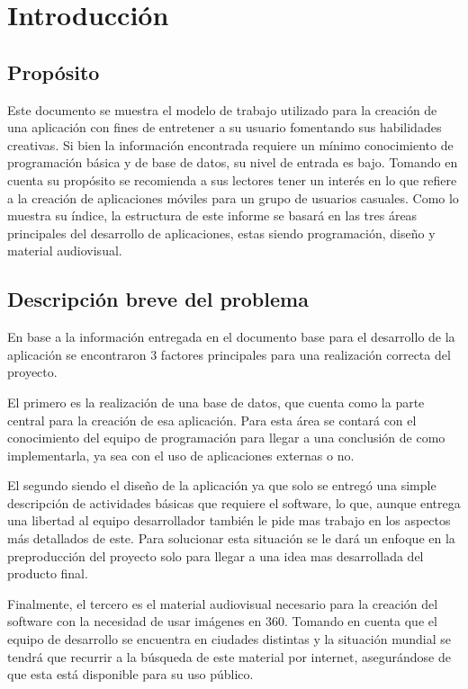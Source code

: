 \section{Introducción}
\subsection{Propósito}
Este documento se muestra el modelo de trabajo utilizado para la creación de una aplicación con fines de entretener a su usuario fomentando sus habilidades creativas. Si bien la información encontrada requiere un mínimo conocimiento de programación básica y de base de datos, su nivel de entrada es bajo. Tomando en cuenta su propósito se recomienda a sus lectores tener un interés en lo que refiere a la creación de aplicaciones móviles para un grupo de usuarios casuales. Como lo muestra su índice, la estructura de este informe se basará en las tres áreas principales del desarrollo de aplicaciones, estas siendo programación, diseño y material audiovisual.
\subsection{Descripción breve del problema}
En base a la información entregada en el documento base para el desarrollo de la aplicación se encontraron 3 factores principales para una realización correcta del proyecto. 

El primero es la realización de una base de datos, que cuenta como la parte central para la creación de esa aplicación. Para esta área se contará con el conocimiento del equipo de programación para llegar a una conclusión de como implementarla, ya sea con el uso de aplicaciones externas o no.

 El segundo siendo el diseño de la aplicación ya que solo se entregó una simple descripción de actividades básicas que requiere el software, lo que, aunque entrega una libertad al equipo desarrollador también le pide mas trabajo en los aspectos más detallados de este. Para solucionar esta situación se le dará un enfoque en la preproducción del proyecto solo para llegar a una idea mas desarrollada del producto final.
 
Finalmente, el tercero es el material audiovisual necesario para la creación del software con la necesidad de usar imágenes en 360. Tomando en cuenta que el equipo de desarrollo se encuentra en ciudades distintas y la situación mundial se tendrá que recurrir a la búsqueda de este material por internet, asegurándose de que esta está disponible para su uso público.